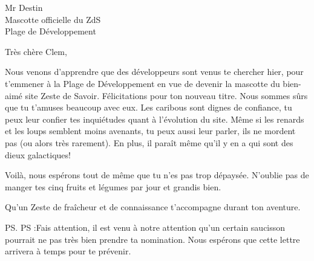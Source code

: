 \documentclass[a4paper, 12pt]{lettre}
\begin{document}
\newcommand{\mondestinataire}{Mr Destin}
\newcommand{\monexpediteur}{Pascal FOUCHER}
\newcommand{\monadresse}{45, rue des dames\\75017 Paris}
   \begin{letter}{\mondestinataire \\
                  Mascotte officielle du ZdS\\
                  Plage de Développement\\
                  }
      \date{le 07 septembre 2014}
      \name{\monexpediteur}
      \address{\monexpediteur\\
               \monadresse}
      \notelephone
      \nofax
      \opening{Très chère Clem,}
         Nous venons d’apprendre que des développeurs sont venus te chercher hier, pour 
         t’emmener à la Plage de Développement en vue de devenir la mascotte du bien-aimé 
         site Zeste de Savoir. Félicitations pour ton nouveau titre. Nous sommes sûrs 
         que tu t’amuses beaucoup avec eux. Les caribous sont dignes de confiance, tu
         peux leur confier tes inquiétudes quant à l’évolution du site. Même si les 
         renards et les loups semblent moins avenants, tu peux aussi leur parler, ils
         ne mordent pas (ou alors très rarement). En plus, il paraît même qu’il y en a 
         qui sont des dieux galactiques!

         Voilà, nous espérons tout de même que tu n’es pas trop dépaysée. N’oublie 
         pas de manger tes cinq fruits et légumes par jour et grandis bien.  
      \closing{Qu’un Zeste de fraîcheur et de connaissance t'accompagne durant ton aventure.}
      \ps{PS :}{Fais attention, il est venu à notre attention qu’un certain saucisson pourrait
          ne pas très bien prendre ta nomination. Nous espérons que cette lettre arrivera 
          à temps pour te prévenir.}
   \end{letter}
\end{document}
